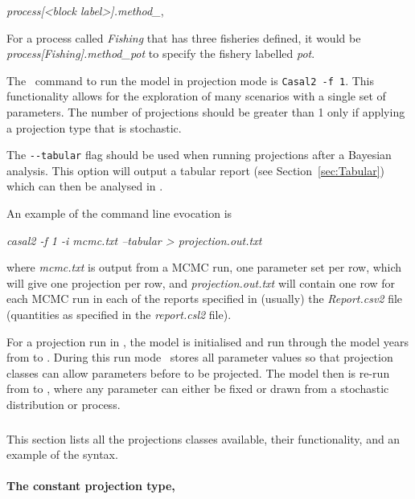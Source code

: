  \textit{process[<block label>].method\_<fisheries label>},

For a process called \textit{Fishing} that has three fisheries defined, it would be \textit{process[Fishing].method\_pot} to specify the fishery labelled \textit{pot}.

The \CNAME\ command to run the model in projection mode is \texttt{Casal2 -f 1}. \TODO{review; NOT IN MANUAL OR ELSEWHERE]} This functionality allows for the exploration of many scenarios with a single set of parameters. The number of projections should be greater than 1 only if applying a projection type that is stochastic.

The \texttt{-{}-tabular} flag should be used when running projections after a Bayesian analysis. This option will output a tabular report (see Section~\ref{sec:Tabular}) which can then be analysed in \R.

An example of the command line evocation is

\textit{casal2 -f 1 -i mcmc.txt --tabular > projection.out.txt}

where \textit{mcmc.txt} is output from a MCMC run, one parameter set per row, which will give one projection per row, and \textit{projection.out.txt} will contain one row for each MCMC run in each of the reports specified in (usually) the \textit{Report.csv2} file (quantities as specified in the \textit{report.csl2} file).

For a projection run in \CNAME, the model is initialised and run through the model years from  to . During this run mode \CNAME\ stores all parameter values so that projection classes can allow parameters before  to be projected. The model then is re-run from  to , where any parameter can either be fixed or drawn from a stochastic distribution or process.


\subsubsection{\label{sec:ProjectionMethods}}

This section lists all the projections classes available, their functionality, and an example of the syntax.

\paragraph[Constant]{The constant projection type, }\label{sec:Project-Constant}


